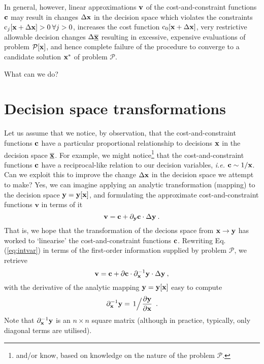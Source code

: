 \documentclass[11pt]{article}
\begin{document}
In general, however, linear approximations $\mathbf{v}$ of the cost-and-constraint functions $\mathbf{c}$ may result in changes $\Delta \mathbf{x}$ in the decision space which violates the constraints $\textrm{c}_j[\mathbf{x} + \Delta \mathbf{x}] > 0 \: \forall j > 0$, increases the cost function $\textrm{c}_0[\mathbf{x} + \Delta \mathbf{x}]$, very restrictive allowable decision changes $\Delta \underline{\overline{\mathbf{x}}}$ resulting in excessive, expensive evaluations of problem $\mathcal{P}[\mathbf{x}]$, and hence complete failure of the procedure to converge to a candidate solution $\mathbf{x}^\ast$ of problem $\mathcal{P}$.

What can we do?

\section{Decision space transformations}

Let us assume that we notice, by observation, that the cost-and-constraint functions $\mathbf{c}$ have a particular proportional relationship to decisions $\mathbf{x}$ in the decision space $\underline{\overline{\mathbf{x}}}$. For example, we might notice\footnote{and/or know, based on knowledge on the nature of the problem $\mathcal{P}$.} that the cost-and-constraint functions $\mathbf{c}$ have a reciprocal-like relation to our decision variables, \emph{i.e.} $\mathbf{c} \sim 1/\mathbf{x}$. Can we exploit this to improve the change $\Delta \mathbf{x}$ in the decision space we attempt to make? Yes, we can imagine applying an analytic transformation (mapping) to the decision space $\mathbf{y} = \mathbf{y}[\mathbf{x}]$, and formulating the approximate cost-and-constraint functions $\textbf{v}$ in terms of it
\begin{equation}
\label{eq:intvar}
    \textbf{v} = \mathbf{c} +   \partial_{\mathbf{y}} \mathbf{c} \cdot \Delta \mathbf{y} \:.
\end{equation}
That is, we hope that the transformation of the decions space from $\mathbf{x} \to \mathbf{y}$ has worked to `linearise' the cost-and-constraint functions $\mathbf{c}$. Rewriting Eq. (\ref{eq:intvar}) in terms of the first-order information supplied by problem $\mathcal{P}$, we retrieve
\begin{equation}
    \textbf{v} = \mathbf{c} + \partial \mathbf{c} \cdot \partial_{\mathbf{x}}^{-1} \mathbf{y} \cdot  \Delta \mathbf{y}    \:,
\end{equation}
with the derivative of the analytic mapping $\mathbf{y} = \mathbf{y}[\mathbf{x}]$ easy to compute
\begin{equation}
    \partial_{\mathbf{x}}^{-1} \mathbf{y} = \left. 1 \Big/ \frac{\partial \mathbf{y}}{\partial \mathbf{x}}\right. \: .
\end{equation}
Note that  $\partial_{\mathbf{x}}^{-1}\mathbf{y}$ is an $n \times n$ square matrix (although in practice, typically, only diagonal terms are utilised).
\end{document}
